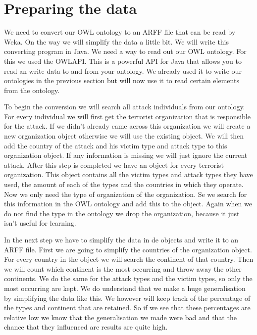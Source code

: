 \documentclass[a4]{article}
\begin{document}
\section{Preparing the data}
\label{sec:preparing_data}
We need to convert our OWL ontology to an ARFF file that can be read by Weka. On the way we will simplify the data a little bit. We will write this converting program in Java. We need a way to read out our OWL ontology. For this we used the OWLAPI\cite{owlapi}. This is a powerful API for Java that allows you to read an write data to and from your ontology. We already used it to write our ontologies in the previous section but will now use it to read certain elements from the ontology.\par
To begin the conversion we will search all attack individuals from our ontology. For every individual we will first get the terrorist organization that is responsible for the attack. If we didn't already came across this organization we will create a new organization object otherwise we will use the existing object. We will then add the country of the attack and his victim type and attack type to this organization object. If any information is missing we will just ignore the current attack. After this step is completed we have an object for every terrorist organization. This object contains all the victim types and attack types they have used, the amount of each of the types and the countries in which they operate. Now we only need the type of organization of the organization. Se we search for this information in the OWL ontology and add this to the object. Again when we do not find the type in the ontology we drop the organization, because it just isn't useful for learning.\par
In the next step we have to simplify the data in de objects and write it to an ARFF file. First we are going to simplify the countries of the organization object. For every country in the object we will search the continent of that country. Then we will count which continent is the most occurring and throw away the other continents. We do the same for the attack types and the victim types, so only the most occurring are kept. We do understand that we make a huge generalisation by simplifying the data like this. We however will keep track of the percentage of the types and continent that are retained. So if we see that these percentages are relative low we know that the generalisation we made were bad and that the chance that they influenced are results are quite high.\par
\end{document}

